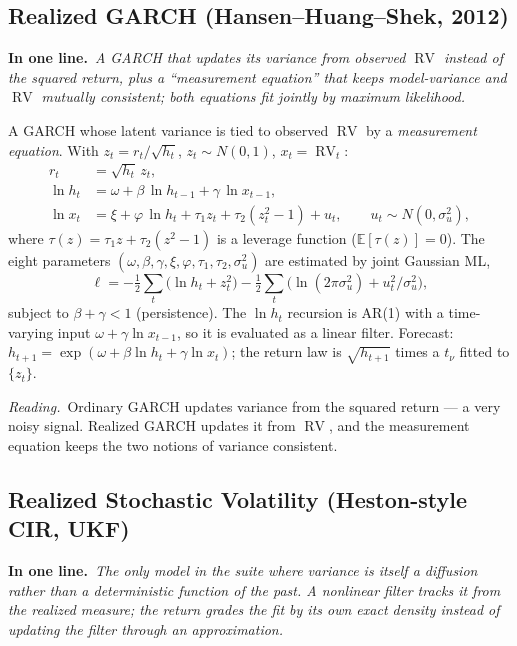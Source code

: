 \documentclass[11pt,a4paper]{article}
\newcommand{\E}{\mathbb{E}}
\newcommand{\RV}{\operatorname{RV}}
\newcommand{\intuition}[1]{\par\smallskip\noindent\textit{Reading.}\ #1\par\smallskip}
\newcommand{\inbrief}[1]{\par\noindent\textbf{In one line.}\ \textit{#1}\par\smallskip}
\begin{document}
\subsection{Realized GARCH (Hansen--Huang--Shek, 2012)}

\inbrief{A GARCH that updates its variance from observed $\RV$ instead of the
squared return, plus a ``measurement equation'' that keeps model-variance and
$\RV$ mutually consistent; both equations fit jointly by maximum likelihood.}

A GARCH whose latent variance is tied to observed $\RV$ by a \emph{measurement
equation}. With $z_t = r_t/\sqrt{h_t}$, $z_t\sim N(0,1)$, $x_t = \RV_t$:
\begin{align}
  r_t &= \sqrt{h_t}\,z_t, \\
  \ln h_t &= \omega + \beta\,\ln h_{t-1} + \gamma\,\ln x_{t-1}, \\
  \ln x_t &= \xi + \varphi\,\ln h_t + \tau_1 z_t + \tau_2(z_t^2 - 1) + u_t,
            \qquad u_t\sim N(0,\sigma_u^2),
\end{align}
where $\tau(z)=\tau_1 z + \tau_2(z^2-1)$ is a leverage function
($\E[\tau(z)]=0$). The eight parameters
$(\omega,\beta,\gamma,\xi,\varphi,\tau_1,\tau_2,\sigma_u^2)$ are estimated by
joint Gaussian ML,
\begin{equation}
  \ell = -\tfrac12\sum_t\big(\ln h_t + z_t^2\big)
         -\tfrac12\sum_t\Big(\ln(2\pi\sigma_u^2) + u_t^2/\sigma_u^2\Big),
\end{equation}
subject to $\beta+\gamma<1$ (persistence). The $\ln h_t$ recursion is AR(1) with
a time-varying input $\omega + \gamma\ln x_{t-1}$, so it is evaluated as a linear
filter. Forecast:
$h_{t+1}=\exp(\omega + \beta\ln h_t + \gamma\ln x_t)$; the return law is
$\sqrt{h_{t+1}}$ times a $t_\nu$ fitted to $\{z_t\}$.

\intuition{Ordinary GARCH updates variance from the squared return --- a very
noisy signal. Realized GARCH updates it from $\RV$, and the measurement equation
keeps the two notions of variance consistent.}

\subsection{Realized Stochastic Volatility (Heston-style CIR, UKF)}\label{sec:sv}

\inbrief{The only model in the suite where variance is itself a diffusion
rather than a deterministic function of the past. A nonlinear filter tracks
it from the realized measure; the return grades the fit by its own exact
density instead of updating the filter through an approximation.}
\end{document}
